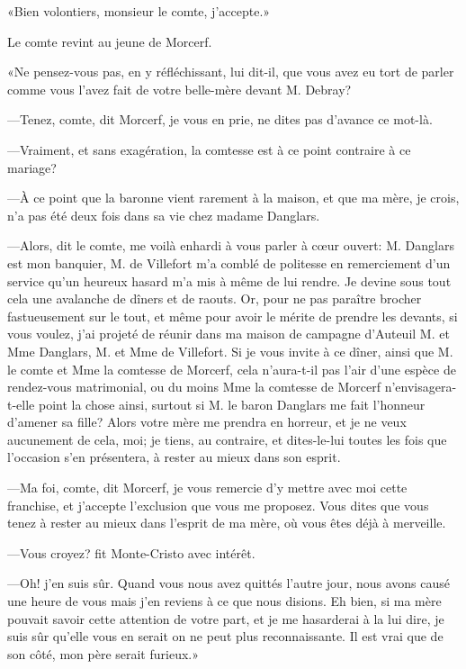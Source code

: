 «Bien volontiers, monsieur le comte, j'accepte.» 

Le comte revint au jeune de Morcerf. 

«Ne pensez-vous pas, en y réfléchissant, lui dit-il, que vous avez eu tort de parler comme vous l'avez fait de votre belle-mère devant M. Debray? 

—Tenez, comte, dit Morcerf, je vous en prie, ne dites pas d'avance ce mot-là. 

—Vraiment, et sans exagération, la comtesse est à ce point contraire à ce mariage? 

—À ce point que la baronne vient rarement à la maison, et que ma mère, je crois, n'a pas été deux fois dans sa vie chez madame Danglars. 

—Alors, dit le comte, me voilà enhardi à vous parler à cœur ouvert: M. Danglars est mon banquier, M. de Villefort m'a comblé de politesse en remerciement d'un service qu'un heureux hasard m'a mis à même de lui rendre. Je devine sous tout cela une avalanche de dîners et de raouts. Or, pour ne pas paraître brocher fastueusement sur le tout, et même pour avoir le mérite de prendre les devants, si vous voulez, j'ai projeté de réunir dans ma maison de campagne d'Auteuil M. et Mme Danglars, M. et Mme de Villefort. Si je vous invite à ce dîner, ainsi que M. le comte et Mme la comtesse de Morcerf, cela n'aura-t-il pas l'air d'une espèce de rendez-vous matrimonial, ou du moins Mme la comtesse de Morcerf n'envisagera-t-elle point la chose ainsi, surtout si M. le baron Danglars me fait l'honneur d'amener sa fille? Alors votre mère me prendra en horreur, et je ne veux aucunement de cela, moi; je tiens, au contraire, et dites-le-lui toutes les fois que l'occasion s'en présentera, à rester au mieux dans son esprit. 

—Ma foi, comte, dit Morcerf, je vous remercie d'y mettre avec moi cette franchise, et j'accepte l'exclusion que vous me proposez. Vous dites que vous tenez à rester au mieux dans l'esprit de ma mère, où vous êtes déjà à merveille. 

—Vous croyez? fit Monte-Cristo avec intérêt. 

—Oh! j'en suis sûr. Quand vous nous avez quittés l'autre jour, nous avons causé une heure de vous mais j'en reviens à ce que nous disions. Eh bien, si ma mère pouvait savoir cette attention de votre part, et je me hasarderai à la lui dire, je suis sûr qu'elle vous en serait on ne peut plus reconnaissante. Il est vrai que de son côté, mon père serait furieux.» 

